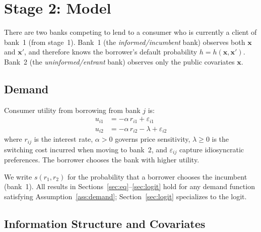 \documentclass[12pt]{article}
\theoremstyle{plain}
\theoremstyle{plain}
\theoremstyle{definition}  %
\theoremstyle{remark}  %
\begin{document}

\newpage
\section{Stage 2: Model}\label{sec:model}

There are two banks competing to lend to a consumer who is currently a client of bank~1 (from stage~1). Bank~1 (the \emph{informed/incumbent} bank) observes both $\mathbf{x}$ and $\mathbf{x}'$, and therefore knows the borrower's default probability $h = h(\mathbf{x}, \mathbf{x}')$. Bank~2 (the \emph{uninformed/entrant} bank) observes only the public covariates $\mathbf{x}$.

\subsection{Demand}

Consumer utility from borrowing from bank $j$ is:
\begin{align*}
    u_{i1} &= -\alpha\, r_{i1} + \varepsilon_{i1} \\
    u_{i2} &= -\alpha\, r_{i2} - \lambda + \varepsilon_{i2}
\end{align*}
where $r_{ij}$ is the interest rate, $\alpha > 0$ governs price sensitivity, $\lambda \geq 0$ is the switching cost incurred when moving to bank~2, and $\varepsilon_{ij}$ capture idiosyncratic preferences. The borrower chooses the bank with higher utility.

We write $s(r_1, r_2)$ for the probability that a borrower chooses the incumbent (bank~1). All results in Sections~\ref{sec:eq}--\ref{sec:logit} hold for any demand function satisfying Assumption~\ref{ass:demand}; Section~\ref{sec:logit} specializes to the logit.

\subsection{Information Structure and Covariates}\label{sec:info}
\end{document}
